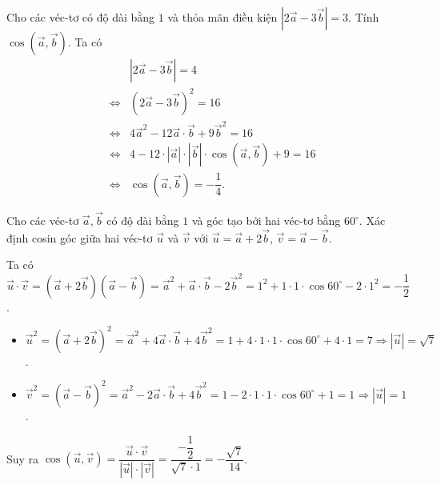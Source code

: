 \begin{bt}%
	Cho các véc-tơ có độ dài bằng $1$ và thỏa mãn điều kiện $|2\overrightarrow{a}-3\overrightarrow{b}|=3$. Tính $\cos(\overrightarrow{a},\overrightarrow{b})$.
	\loigiai
	{
		Ta có
		\begin{eqnarray*}
			&&|2\overrightarrow{a}-3\overrightarrow{b}|=4\\
			&\Leftrightarrow& \left(2\overrightarrow{a}-3\overrightarrow{b}\right)^2=16\\
			&\Leftrightarrow& 4\overrightarrow{a}^2-12\overrightarrow{a}\cdot \overrightarrow{b}+9\overrightarrow{b}^2=16\\
			&\Leftrightarrow& 4-12\cdot |\overrightarrow{a}|\cdot |\overrightarrow{b}|\cdot \cos(\overrightarrow{a},\overrightarrow{b})+9=16\\
			&\Leftrightarrow& \cos(\overrightarrow{a},\overrightarrow{b})=-\dfrac{1}{4}.
		\end{eqnarray*}
	}
\end{bt}

\begin{bt}%
	Cho các véc-tơ $\overrightarrow{a}, \overrightarrow{b}$ có độ dài bằng $1$ và góc tạo bởi hai véc-tơ bằng $60^\circ$. Xác định cosin góc giữa hai véc-tơ $\overrightarrow{u}$ và $\overrightarrow{v}$ với $\overrightarrow{u}=\overrightarrow{a}+2\overrightarrow{b}$, $\overrightarrow{v}=\overrightarrow{a}-\overrightarrow{b}$.
	\loigiai
	{
		Ta có $\overrightarrow{u}\cdot\overrightarrow{v}=\left(\overrightarrow{a}+2\overrightarrow{b}\right)\left(\overrightarrow{a}-\overrightarrow{b}\right)=\overrightarrow{a}^2+\overrightarrow{a}\cdot\overrightarrow{b}-2\overrightarrow{b}^2=1^2+1\cdot 1\cdot \cos 60^\circ-2\cdot 1^2=-\dfrac{1}{2}$.
		\begin{itemize}
			\item $\overrightarrow{u}^2=\left(\overrightarrow{a}+2\overrightarrow{b}\right)^2=\overrightarrow{a}^2+4\overrightarrow{a}\cdot \overrightarrow{b}+4\overrightarrow{b}^2=1+4\cdot 1\cdot 1\cdot\cos 60^\circ+4\cdot 1=7\Rightarrow |\overrightarrow{u}|=\sqrt{7}$.
			\item $\overrightarrow{v}^2=\left(\overrightarrow{a}-\overrightarrow{b}\right)^2=\overrightarrow{a}^2-2\overrightarrow{a}\cdot \overrightarrow{b}+4\overrightarrow{b}^2=1-2\cdot 1\cdot 1\cdot \cos 60^\circ+1=1\Rightarrow |\overrightarrow{u}|=1$.
		\end{itemize}
		Suy ra $\cos(\overrightarrow{u},\overrightarrow{v})=\dfrac{\overrightarrow{u}\cdot \overrightarrow{v}}{|\overrightarrow{u}|\cdot |\overrightarrow{v}|}=\dfrac{-\dfrac{1}{2}}{\sqrt{7}\cdot 1}=-\dfrac{\sqrt{7}}{14}$.
	}
\end{bt}

